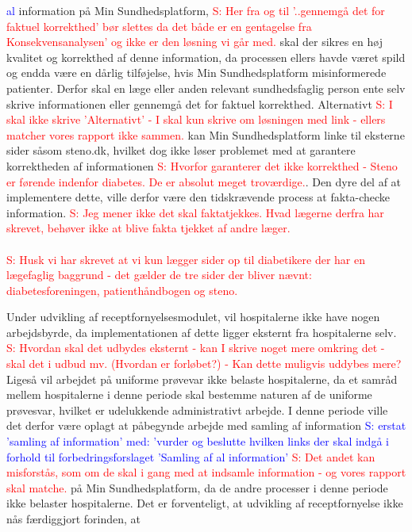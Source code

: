 \begin{itemize}
	\textcolor{blue}{al} information på Min Sundhedsplatform, \textcolor{red}{S: Her fra og til '..gennemgå det for faktuel korrekthed' bør slettes da det både er en gentagelse fra Konsekvensanalysen' og ikke er den løsning vi går med.} skal der sikres en høj kvalitet og korrekthed af denne information, da processen ellers havde været spild og endda være en dårlig tilføjelse, hvis Min Sundhedsplatform misinformerede patienter. Derfor skal en læge eller anden relevant sundhedsfaglig person ente selv skrive informationen eller gennemgå det for faktuel korrekthed. Alternativt \textcolor{red}{S: I skal ikke skrive 'Alternativt' - I skal kun skrive om løsningen med link - ellers matcher vores rapport ikke sammen.}  kan Min Sundhedsplatform linke til eksterne sider såsom steno.dk, hvilket dog ikke løser problemet med at garantere korrektheden af informationen
	\textcolor{red}{S: Hvorfor garanterer det ikke korrekthed - Steno er førende indenfor diabetes. De er absolut meget troværdige.}. Den dyre del af at implementere dette, ville derfor være den tidskrævende process at fakta-checke information.
	\textcolor{red}{S: Jeg mener ikke det skal faktatjekkes. Hvad lægerne derfra har skrevet, behøver ikke at blive fakta tjekket af andre læger.
	}
\textcolor{red}{\\\\S: Husk vi har skrevet at vi kun lægger sider op til diabetikere der har en lægefaglig baggrund - det gælder de tre sider der bliver nævnt: diabetesforeningen, patienthåndbogen og steno.}
\end{itemize}
Under udvikling af receptfornyelsesmodulet, vil hospitalerne ikke have nogen arbejdsbyrde, da implementationen af dette ligger eksternt fra hospitalerne selv.
\textcolor{red}{S: Hvordan skal det udbydes eksternt - kan I skrive noget mere omkring det - skal det i udbud mv. (Hvordan er forløbet?) - Kan dette muligvis uddybes mere?} Ligeså vil arbejdet på uniforme prøvevar ikke belaste hospitalerne, da et samråd mellem hospitalerne i denne periode skal bestemme naturen af de uniforme prøvesvar, hvilket er udelukkende administrativt arbejde. I denne periode ville det derfor være oplagt at påbegynde arbejde med samling af information
\textcolor{blue}{S: erstat 'samling af information' med: 'vurder og beslutte hvilken links der skal indgå i forhold til forbedringsforslaget 'Samling af al information'}
\textcolor{red}{S: Det andet kan misforstås, som om de skal i gang med at indsamle information - og vores rapport skal matche.}
 på Min Sundhedsplatform, da de andre processer i denne periode ikke belaster hospitalerne. Det er forventeligt, at udvikling af receptfornyelse ikke nås færdiggjort forinden, at 
